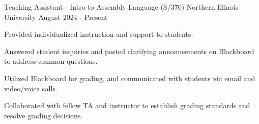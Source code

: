 

\begin{cventries}

  \cventry
    {Teaching Assistant - Intro to Assembly Language (S/370)} %
    {Northern Illinois University} %
    {} %
    {August 2024 - Present} %
    {
      \begin{cvitems} %
        \item {Provided individualized instruction and support to students.}
        \item {Answered student inquiries and posted clarifying announcements on Blackboard to address common questions.}
        \item {Utilized Blackboard for grading, and communicated with students via email and video/voice calls.}
        \item {Collaborated with fellow TA and instructor to establish grading standards and resolve grading decisions.}
      \end{cvitems}
    }

\end{cventries}